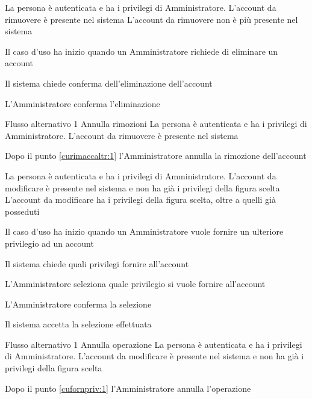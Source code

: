 {}
{La persona è autenticata e ha i privilegi di Amministratore. L'account da rimuovere è presente nel sistema}
{L'account da rimuovere non è più presente nel sistema}
{\begin{enumCU}
	\item Il caso d'uso ha inizio quando un Amministratore richiede di eliminare un account
	\item Il sistema chiede conferma dell'eliminazione dell'account \label{curimaccaltr:1}
	\item L'Amministratore conferma l'eliminazione
\end{enumCU}}
%
{Flusso alternativo 1}%
{Annulla rimozioni}%
{La persona è autenticata e ha i privilegi di Amministratore. L'account da rimuovere è presente nel sistema}%
{\postNulle}%
{\begin{enumCU}
		\item Dopo il punto \ref{curimaccaltr:1} l'Amministratore annulla la rimozione dell'account
	\end{enumCU}}%

\tabcuvspace

{}
{La persona è autenticata e ha i privilegi di Amministratore. L'account da modificare è presente nel sistema e non ha già i privilegi della figura scelta}
{L'account da modificare ha i privilegi della figura scelta, oltre a quelli già posseduti}
{\begin{enumCU}
	\item Il caso d'uso ha inizio quando un Amministratore vuole fornire un ulteriore privilegio ad un account
	\item Il sistema chiede quali privilegi fornire all'account 
	\item L'Amministratore seleziona quale privilegio si vuole fornire all'account \label{cufornpriv:1}
	\item L'Amministratore conferma la selezione
	\item Il sistema accetta la selezione effettuata
\end{enumCU}}
%
{Flusso alternativo 1}%
{Annulla operazione}%
{La persona è autenticata e ha i privilegi di Amministratore. L'account da modificare è presente nel sistema e non ha già i privilegi della figura scelta}%
{\postNulle}%
{\begin{enumCU}
		\item Dopo il punto \ref{cufornpriv:1} l'Amministratore annulla l'operazione
	\end{enumCU}}%

